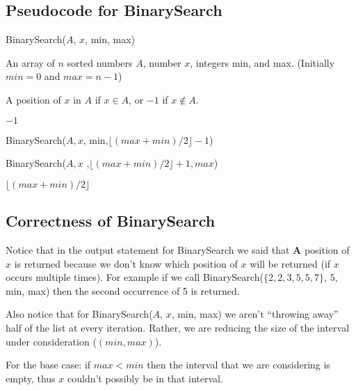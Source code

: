 \documentclass[twoside]{article}
\begin{document}
\subsection{Pseudocode for {\sc BinarySearch} }
\begin{algorithm}[H]
\caption*{{\sc BinarySearch($A$, $x$, min, max)}}\label{alg:binary_search}
\begin{algorithmic}[1]

\INPUT An array of $n$ sorted numbers $A$, number $x$, integers min,
and max. 
(Initially $min = 0$ and $max = n-1$)

\OUTPUT A position of $x$ in $A$ if $x\in A$, or $-1$ if $x\notin A$.


\Return $-1$


\Else




\Return BinarySearch($A, x$, min,$\lfloor (max + min)/2 \rfloor  -1$) 




\Return BinarySearch($A, x$ ,$\lfloor (max + min)/2 \rfloor  +1, max$) 


\Else
 

\Return $\lfloor (max + min)/2 \rfloor $
\EndIf


\EndIf

\end{algorithmic}
\end{algorithm} 

\subsection{Correctness of {\sc BinarySearch}}
Notice that in the output statement for {\sc BinarySearch} we said
that {\bf A} position of $x$ is returned because we don't know which
position of $x$ will be returned (if $x$ occurs multiple times). For
example if we call  {\sc BinarySearch($\{2, 2, 3, 5, 5, 7\}$, $5$, min,
  max)} then the second occurrence of 5 is returned. 

Also notice that for {\sc BinarySearch($A$, $x$, min, max)} we aren't
``throwing away'' half of the list at every iteration. Rather, we are
reducing the size of the interval under consideration ($(min,max)$).

For the base case: if $max < min$ then the interval that we are
considering is empty, thus $x$ couldn't possibly be in that interval.
\end{document}
